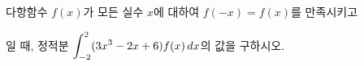 다항함수 $f(x)$가 모든 실수 $x$에 대하여 $f(-x)=f(x)$를 만족시키고 \par\smallskip{}\par\smallskip\noindent 일 때, 정적분 $\displaystyle\int_{-2}^{2}(3x^3-2x+6)f(x)\mkern3mu dx$의 값을 구하시오.
